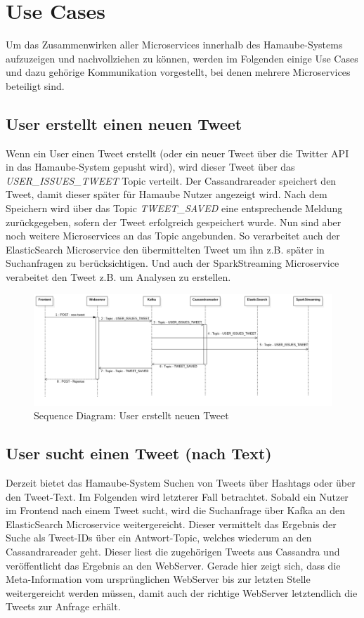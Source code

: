 \section{Use Cases}
\label{Use Cases}
Um das Zusammenwirken aller Microservices innerhalb des Hamaube-Systems aufzuzeigen und nachvollziehen zu können, werden im Folgenden einige Use Cases und dazu gehörige Kommunikation vorgestellt, bei denen mehrere Microservices beteiligt sind.

\subsection{User erstellt einen neuen Tweet}
Wenn ein User einen Tweet erstellt (oder ein neuer Tweet über die Twitter API in das Hamaube-System gepusht wird),
wird dieser Tweet über das \textit{USER\_ISSUES\_TWEET} Topic verteilt.
Der Cassandrareader speichert den Tweet, damit dieser später für Hamaube Nutzer angezeigt wird. Nach dem Speichern wird über das Topic \textit{TWEET\_SAVED} eine entsprechende Meldung zurückgegeben, sofern der Tweet erfolgreich gespeichert wurde.
Nun sind aber noch weitere Microservices an das Topic angebunden. So verarbeitet auch der ElasticSearch Microservice den übermittelten Tweet um ihn z.B. später in Suchanfragen zu berücksichtigen. Und auch der SparkStreaming Microservice verabeitet den Tweet z.B. um Analysen zu erstellen.

\begin{figure}[htbp!]
	\centering
	\includegraphics[width=\textwidth]{pics/useCases/IssueTweet}
	\caption{Sequence Diagram: User erstellt neuen Tweet}
\end{figure}

\subsection{User sucht einen Tweet (nach Text)}
Derzeit bietet das Hamaube-System Suchen von Tweets über Hashtags oder über den Tweet-Text.
Im Folgenden wird letzterer Fall betrachtet.
Sobald ein Nutzer im Frontend nach einem Tweet sucht, wird die Suchanfrage über Kafka an den ElasticSearch Microservice weitergereicht. Dieser vermittelt das Ergebnis der Suche als Tweet-IDs über ein Antwort-Topic, welches wiederum an den Cassandrareader geht.
Dieser liest die zugehörigen Tweets aus Cassandra und veröffentlicht das Ergebnis an den WebServer.
Gerade hier zeigt sich, dass die Meta-Information vom ursprünglichen WebServer bis zur letzten Stelle weitergereicht werden müssen, damit auch der richtige WebServer letztendlich die Tweets zur Anfrage erhält.


